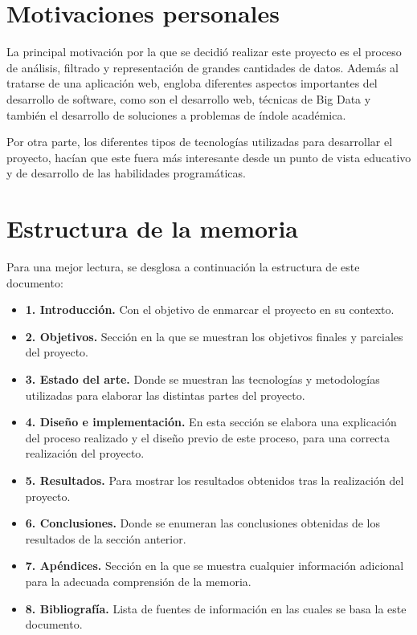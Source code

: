 \documentclass[a4paper, spanish, 12pt]{book}
\begin{document}
\section{Motivaciones personales}
\label{sec:motivaciones}

La principal motivaci\'on por la que se decidi\'o realizar este proyecto es el
proceso de an\'alisis, filtrado y representaci\'on de grandes cantidades de datos.
Adem\'as al tratarse de una aplicaci\'on web, engloba diferentes
aspectos importantes del desarrollo de software, como son el desarrollo web,
t\'ecnicas de Big Data y tambi\'en el desarrollo de soluciones a problemas de
\'indole acad\'emica.

Por otra parte, los diferentes tipos de tecnolog\'ias utilizadas para desarrollar
el proyecto, hac\'ian que este fuera m\'as interesante desde un punto de vista
educativo y de desarrollo de las habilidades program\'aticas.

\section{Estructura de la memoria}
\label{sec:estructura}

Para una mejor lectura, se desglosa a continuaci\'on la estructura de este documento:

\begin{itemize}
  \item \textbf{1. Introducci\'on.} Con el objetivo de enmarcar el proyecto en
  su contexto.

  \item \textbf{2. Objetivos.} Secci\'on en la que se muestran los objetivos
  finales y parciales del proyecto.

  \item \textbf{3. Estado del arte.} Donde se muestran las tecnolog\'ias y metodolog\'ias
  utilizadas para elaborar las distintas partes del proyecto.

  \item \textbf{4. Dise\~no e implementaci\'on.} En esta secci\'on se elabora una
  explicaci\'on del proceso realizado y el dise\~no previo de este proceso, para
  una correcta realizaci\'on del proyecto.

  \item \textbf{5. Resultados.} Para mostrar los resultados obtenidos tras la realizaci\'on
  del proyecto.

  \item \textbf{6. Conclusiones.} Donde se enumeran las conclusiones obtenidas de
  los resultados de la secci\'on anterior.

  \item \textbf{7. Ap\'endices.} Secci\'on en la que se muestra cualquier informaci\'on
  adicional para la adecuada comprensi\'on de la memoria.

  \item \textbf{8. Bibliograf\'ia.} Lista de fuentes de informaci\'on en las cuales
  se basa la este documento.
\end{itemize}
\end{document}
